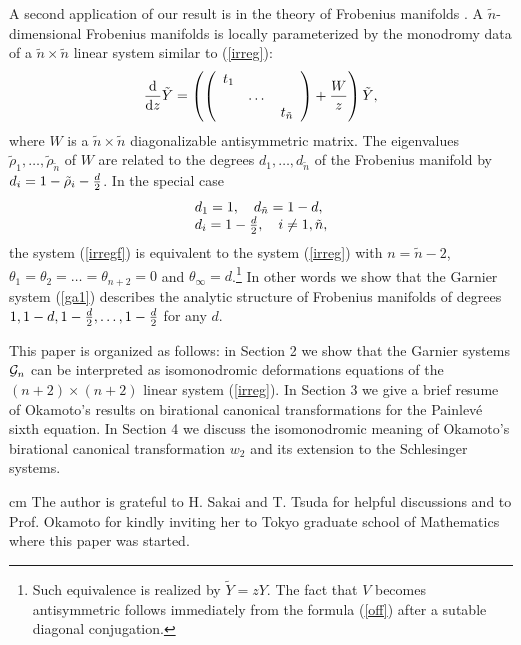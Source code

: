 \documentclass[12pt]{article}
\theoremstyle{definition}
\theoremstyle{theorem}
\begin{document}
A second application of our result is in the theory of Frobenius manifolds
\cite{Dub7}. 
A $\tilde n$-dimensional Frobenius manifolds is locally parameterized 
by the monodromy data of a $\tilde n\times\tilde n$ linear system 
similar to (\ref{irreg}):
\begin{equation}
{{\rm d}\over{\rm d}z}\tilde Y
=\left(\left(\begin{array}{ccc}t_1& & \\ & \dots&\\ & & t_{\tilde n}
\end{array}\right)+{W\over z}\right)\tilde Y,
\label{irregf}\end{equation}
where $W$ is a $\tilde n\times\tilde n$ diagonalizable antisymmetric matrix. 
The eigenvalues $\tilde\rho_1,\dots,\tilde\rho_{\tilde n}$ of $W$ are related 
to the degrees $d_1,\dots,d_{\tilde n}$ of the Frobenius manifold by
$d_i=1-\tilde\rho_i-{d\over2}$. In the special case 
$$
\begin{array}{l}
d_1=1,\quad d_{\tilde n}=1-d,\\
d_i=1-{d\over2},\quad i\neq1,\tilde n,\\
\end{array}
$$
the system (\ref{irregf}) is equivalent to the system (\ref{irreg}) with
$n=\tilde n-2$, $\theta_1=\theta_2=\dots=\theta_{n+2}=0$ and 
$\theta_\infty=d$.\footnote{Such equivalence is realized by $\tilde Y=z Y$. 
The fact that $V$ becomes antisymmetric follows immediately from the formula
(\ref{off}) after a sutable diagonal conjugation.} 
In other words we show that the Garnier system (\ref{ga1}) describes 
the analytic structure of Frobenius manifolds of degrees
$1, 1-d, 1-{d\over2},\dots,1-{d\over2}$ for any $d$.

This paper is organized as follows: in Section 2 we show that the 
Garnier systems ${\cal G}_n$ can be 
interpreted as isomonodromic deformations equations of the
$(n+2)\times(n+2)$ linear system (\ref{irreg}). In Section 3  we give a 
brief resume of Okamoto's results on birational canonical 
transformations for the Painlev\'e sixth equation.
In Section 4 we discuss the isomonodromic meaning of Okamoto's birational 
canonical transformation $w_2$ and its extension to the Schlesinger systems.


 cm
 The author is grateful to H. Sakai and T. Tsuda
for helpful discussions and to Prof. Okamoto for kindly inviting her to Tokyo
graduate school of Mathematics where this paper was started.
\end{document}

